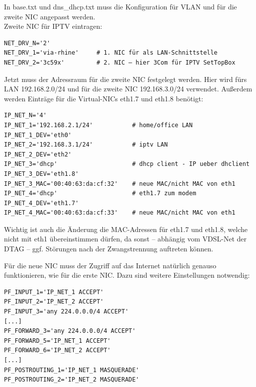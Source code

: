 In base.txt und dns\_dhcp.txt muss die Konfiguration für VLAN und für die zweite
NIC angepasst werden.\\

\noindent Zweite NIC für IPTV eintragen:\\

\begin{example}
\begin{verbatim}
NET_DRV_N='2'
NET_DRV_1='via-rhine'     # 1. NIC für als LAN-Schnittstelle
NET_DRV_2='3c59x'         # 2. NIC – hier 3Com für IPTV SetTopBox
\end{verbatim}
\end{example}

Jetzt muss der Adressraum für die zweite NIC festgelegt werden. Hier wird fürs
LAN 192.168.2.0/24 und für die zweite NIC 192.168.3.0/24 verwendet. Außerdem
werden Einträge für die Virtual-NICs eth1.7 und eth1.8 benötigt:\\

\begin{example}
\begin{verbatim}
IP_NET_N='4'
IP_NET_1='192.168.2.1/24'           # home/office LAN
IP_NET_1_DEV='eth0'
IP_NET_2='192.168.3.1/24'           # iptv LAN
IP_NET_2_DEV='eth2'
IP_NET_3='dhcp'                     # dhcp client - IP ueber dhclient
IP_NET_3_DEV='eth1.8'
IP_NET_3_MAC='00:40:63:da:cf:32'    # neue MAC/nicht MAC von eth1
IP_NET_4='dhcp'                     # eth1.7 zum modem
IP_NET_4_DEV='eth1.7'
IP_NET_4_MAC='00:40:63:da:cf:33'    # neue MAC/nicht MAC von eth1
\end{verbatim}
\end{example}

Wichtig ist auch die Änderung die MAC-Adressen für eth1.7 und eth1.8, welche
nicht mit eth1 übereinstimmen dürfen, da sonst – abhängig vom VDSL-Net der DTAG
– ggf. Störungen nach der Zwangstrennung auftreten können.

Für die neue NIC muss der Zugriff auf das Internet natürlich genauso
funktionieren, wie für die erste NIC. Dazu sind weitere Einstellungen
notwendig:\\

\begin{example}
\begin{verbatim}
PF_INPUT_1='IP_NET_1 ACCEPT'
PF_INPUT_2='IP_NET_2 ACCEPT'
PF_INPUT_3='any 224.0.0.0/4 ACCEPT'
[...]
PF_FORWARD_3='any 224.0.0.0/4 ACCEPT'
PF_FORWARD_5='IP_NET_1 ACCEPT'
PF_FORWARD_6='IP_NET_2 ACCEPT'
[...]
PF_POSTROUTING_1='IP_NET_1 MASQUERADE'
PF_POSTROUTING_2='IP_NET_2 MASQUERADE'
\end{verbatim}
\end{example}

